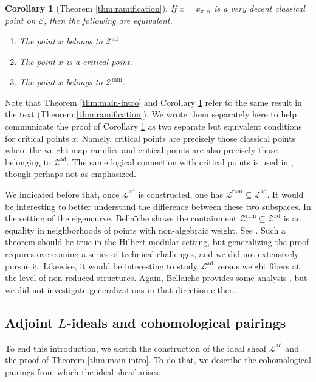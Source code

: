 \documentclass[10pt, twoside]{amsart}
\theoremstyle{plain}
\newtheorem{corollary}[theorem]{Corollary}
\theoremstyle{definition}
\theoremstyle{remark}
\numberwithin{equation}{subsection}
\def\ad{\operatorname{ad}}
\def\scre{\mathscr E}
\def\scrl{\mathscr L}
\def\scrz{\mathscr{Z}}
\begin{document}
\begin{corollary}[Theorem \ref{thm:ramification}] \label{cor:intro}
If $x=x_{\pi,\alpha}$ is a very decent classical point on $\scre$, then the following are equivalent.
\begin{enumerate}[label=(\roman*)]
\item The point $x$ belongs to $\scrz^{\ad}$.\label{cor-part:intro-zero-locus}
\item The point $x$ is a critical point.\label{cor-part:intro-critical}
\item The point $x$ belongs to $\scrz^{\mathrm{ram}}$.\label{cor-part:intro-ramify}
\end{enumerate}
\end{corollary}
Note that Theorem \ref{thm:main-intro} and Corollary \ref{cor:intro} refer to the same result in the text (Theorem \ref{thm:ramification}). We wrote them separately here to help communicate the proof of Corollary \ref{cor:intro} as two separate but equivalent conditions for critical points $x$. Namely, critical points are precisely those classical points where the weight map ramifies and critical points are also precisely those belonging to $\scrz^{\ad}$. The same logical connection with critical points is used in \cite[Chapter 9]{Bel}, though perhaps not as emphasized.

We indicated before that, once $\scrl^{\ad}$ is constructed, one has $\scrz^{\mathrm{ram}} \subseteq \scrz^{\ad}$. It would be interesting to better understand the difference between these two subspaces. In the setting of the eigencurve, Bella\"iche shows the containment $\scrz^{\mathrm{ram}} \subseteq \scrz^{\ad}$ is an equality in neighborhoods of points with non-algebraic weight. See \cite[Theorem 9.4.7]{Bel}. Such a theorem should be true in the Hilbert modular setting, but generalizing the proof requires overcoming a series of technical challenges, and we did not extensively pursue it. Likewise, it would be interesting to study $\scrl^{\ad}$ versus weight fibers at the level of non-reduced structures. Again, Bella\"iche provides some analysis \cite[Theorem 9.4.8]{Bel}, but we did not investigate generalizations in that direction either.


\subsection{Adjoint $L$-ideals and cohomological pairings}\label{subsec:pairing-intro}

To end this introduction, we sketch the construction of the ideal sheaf $\scrl^{\ad}$ and the proof of Theorem \ref{thm:main-intro}. To do that, we describe the cohomological pairings from which the ideal sheaf arises. 
\end{document}
